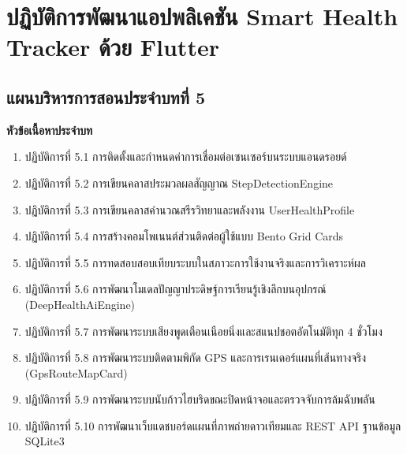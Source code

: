 \chapter{ปฏิบัติการพัฒนาแอปพลิเคชัน Smart Health Tracker ด้วย Flutter}
\label{chap:ch05}

\section*{แผนบริหารการสอนประจำบทที่ 5}

\noindent\textbf{หัวข้อเนื้อหาประจำบท}
\begin{enumerate}
    \item ปฏิบัติการที่ 5.1 การติดตั้งและกำหนดค่าการเชื่อมต่อเซนเซอร์บนระบบแอนดรอยด์
    \item ปฏิบัติการที่ 5.2 การเขียนคลาสประมวลผลสัญญาณ StepDetectionEngine
    \item ปฏิบัติการที่ 5.3 การเขียนคลาสคำนวณสรีรวิทยาและพลังงาน UserHealthProfile
    \item ปฏิบัติการที่ 5.4 การสร้างคอมโพเนนต์ส่วนติดต่อผู้ใช้แบบ Bento Grid Cards
    \item ปฏิบัติการที่ 5.5 การทดสอบสอบเทียบระบบในสภาวะการใช้งานจริงและการวิเคราะห์ผล
    \item ปฏิบัติการที่ 5.6 การพัฒนาโมเดลปัญญาประดิษฐ์การเรียนรู้เชิงลึกบนอุปกรณ์ (DeepHealthAiEngine)
    \item ปฏิบัติการที่ 5.7 การพัฒนาระบบเสียงพูดเตือนเนือยนิ่งและสแนปชอตอัตโนมัติทุก 4 ชั่วโมง
    \item ปฏิบัติการที่ 5.8 การพัฒนาระบบติดตามพิกัด GPS และการเรนเดอร์แผนที่เส้นทางจริง (GpsRouteMapCard)
    \item ปฏิบัติการที่ 5.9 การพัฒนาระบบนับก้าวไฮบริดขณะปิดหน้าจอและตรวจจับการล้มฉับพลัน
    \item ปฏิบัติการที่ 5.10 การพัฒนาเว็บแดชบอร์ดแผนที่ภาพถ่ายดาวเทียมและ REST API ฐานข้อมูล SQLite3
\end{enumerate}

